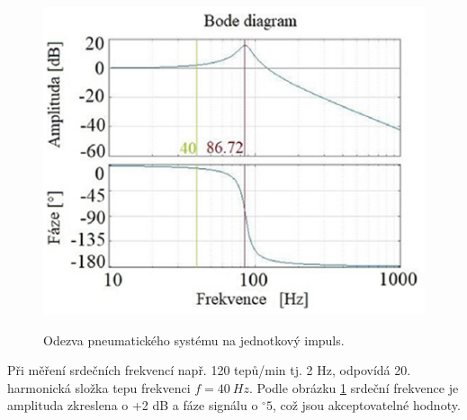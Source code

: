 \begin{figure}[H]
    \caption{Odezva pneumatického systému na jednotkový impuls.}
    \includegraphics[width=1\textwidth]{pictures/freq_char_pneu.png}
    \label{fig:pneu_freq_char}
\end{figure}
Při měření srdečních frekvencí např. 120 tepů/min tj. 2 Hz, odpovídá 20. harmonická složka tepu frekvenci $f = 40 \ Hz$. Podle obrázku \ref{fig:pneu_freq_char} srdeční frekvence je amplituda zkreslena o +2 dB a fáze signálu o $^\circ 5$, což jsou akceptovatelné hodnoty.
